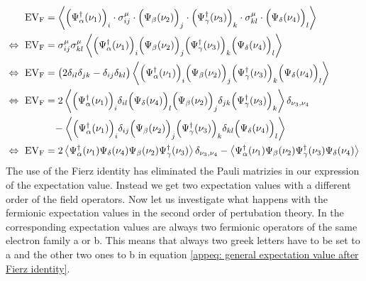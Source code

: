 %
\begin{align}
	\mt{EV}_{\mt{F}} &= \expval{\Big(\Psi_{\alpha}^{\dag}(\nu_{1})\Big)_{i} \cdot \sigma_{ij}^{\mu} \cdot \Big(\Psi_{\beta}(\nu_{2})\Big)_{j} \cdot \Big(\Psi_{\gamma}^{\dag}(\nu_{3})\Big)_{k} \cdot \sigma_{kl}^{\mu} \cdot \Big(\Psi_{\delta}(\nu_{4})\Big)_{l}}
	\notag \\ 
	\Leftrightarrow\ \mt{EV}_{\mt{F}} &= \sigma_{ij}^{\mu} \sigma_{kl}^{\mu} \expval{\Big(\Psi_{\alpha}^{\dag}(\nu_{1})\Big)_{i} \Big(\Psi_{\beta}(\nu_{2})\Big)_{j} \Big(\Psi_{\gamma}^{\dag}(\nu_{3})\Big)_{k} \Big(\Psi_{\delta}(\nu_{4})\Big)_{l}}
	\notag \\ 
	\Leftrightarrow\ \mt{EV}_{\mt{F}} &= \big(2 \delta_{il} \delta_{jk} - \delta_{ij} \delta_{kl}\big) \expval{\Big(\Psi_{\alpha}^{\dag}(\nu_{1})\Big)_{i} \Big(\Psi_{\beta}(\nu_{2})\Big)_{j} \Big(\Psi_{\gamma}^{\dag}(\nu_{3})\Big)_{k} \Big(\Psi_{\delta}(\nu_{4})\Big)_{l}}
	\notag \\ 
	\Leftrightarrow\ \mt{EV}_{\mt{F}} &= 
		2 \expval{
			\Big(\Psi_{\alpha}^{\dag}(\nu_{1})\Big)_{i} 
			\delta_{il} 
			\Big(\Psi_{\delta}(\nu_{4})\Big)_{l} 
			\Big(\Psi_{\beta}(\nu_{2})\Big)_{j} 
			\delta_{jk}
			\Big(\Psi_{\gamma}^{\dag}(\nu_{3})\Big)_{k}
		}
		\delta_{\nu_{3},\nu_{4}}
		\notag \\ &\,\,\enspace -
		\expval{
			\Big(\Psi_{\alpha}^{\dag}(\nu_{1})\Big)_{i} 
			\delta_{ij}
			\Big(\Psi_{\beta}(\nu_{2})\Big)_{j} 
			\Big(\Psi_{\gamma}^{\dag}(\nu_{3})\Big)_{k} 
			\delta_{kl}
			\Big(\Psi_{\delta}(\nu_{4})\Big)_{l}
		}
		\notag \\ 
	\Leftrightarrow\ \mt{EV}_{\mt{F}} &= 
		2 \expval{
			\Psi_{\alpha}^{\dag}(\nu_{1}) 
			\Psi_{\delta}(\nu_{4})
			\Psi_{\beta}(\nu_{2})
			\Psi_{\gamma}^{\dag}(\nu_{3})
		}
		\delta_{\nu_{3},\nu_{4}}
		-
		\expval{
			\Psi_{\alpha}^{\dag}(\nu_{1})
			\Psi_{\beta}(\nu_{2})
			\Psi_{\gamma}^{\dag}(\nu_{3})
			\Psi_{\delta}(\nu_{4})
		}
	\label{appeq: general expectation value after Fierz identity}
\end{align}
%
The use of the Fierz identity has eliminated the Pauli matrizies in our expression of the expectation value.
Instead we get two expectation values with a different order of the field operators.
Now let us investigate what happens with the fermionic expectation values in the second order of pertubation theory.
In the corresponding expectation values are always two fermionic operators of the same electron family a or b.
This means that always two greek letters have to be set to a and the other two ones to b in equation \eqref{appeq: general expectation value after Fierz identity}.
